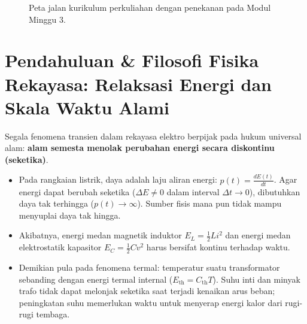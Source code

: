 \documentclass[11pt,a4paper]{article}
\theoremstyle{definition}
\begin{document}
\begin{figure}[htbp]
{%
}
\caption{Peta jalan kurikulum perkuliahan dengan penekanan pada Modul Minggu 3.}
\label{fig:peta_jalan_pd_w3}
\end{figure}

\section{Pendahuluan \& Filosofi Fisika Rekayasa: Relaksasi Energi dan Skala Waktu Alami}

Segala fenomena transien dalam rekayasa elektro berpijak pada hukum universal alam: \textbf{alam semesta menolak perubahan energi secara diskontinu (seketika)}. 
\begin{itemize}[leftmargin=*]
    \item Pada rangkaian listrik, daya adalah laju aliran energi: $p(t) = \frac{dE(t)}{dt}$. Agar energi dapat berubah seketika ($\Delta E \neq 0$ dalam interval $\Delta t \to 0$), dibutuhkan daya tak terhingga ($p(t) \to \infty$). Sumber fisis mana pun tidak mampu menyuplai daya tak hingga.
    \item Akibatnya, energi medan magnetik induktor $E_L = \frac{1}{2} L i^2$ dan energi medan elektrostatik kapasitor $E_C = \frac{1}{2} C v^2$ harus bersifat kontinu terhadap waktu.
    \item Demikian pula pada fenomena termal: temperatur suatu transformator sebanding dengan energi termal internal ($E_{\text{th}} = C_{\text{th}} T$). Suhu inti dan minyak trafo tidak dapat melonjak seketika saat terjadi kenaikan arus beban; peningkatan suhu memerlukan waktu untuk menyerap energi kalor dari rugi-rugi tembaga.
\end{itemize}
\end{document}
